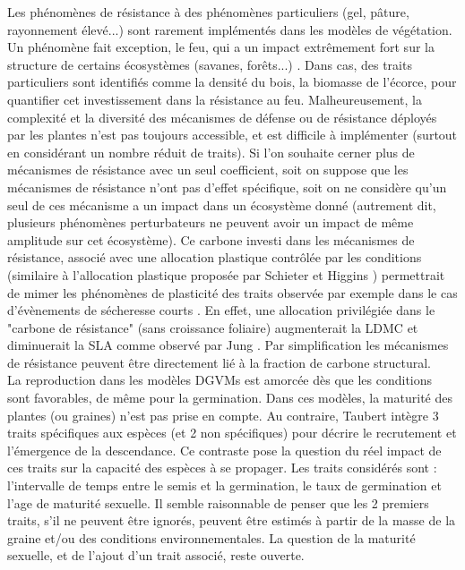 \documentclass[french]{article}
\begin{document}
{\indent Les phénomènes de résistance à des phénomènes particuliers (gel, pâture, rayonnement élevé...) sont rarement implémentés dans les modèles de végétation. Un phénomène fait exception, le feu, qui a un impact extrêmement fort sur la structure de certains écosystèmes (savanes, forêts...) \cite{Scheiter2013}. Dans cas, des traits particuliers sont identifiés comme la densité du bois, la biomasse de l'écorce, pour quantifier cet investissement dans la résistance au feu. Malheureusement, la complexité et la diversité des mécanismes de défense ou de résistance déployés par les plantes n'est pas toujours accessible, et est difficile à implémenter (surtout en considérant un nombre réduit de traits). Si l'on souhaite cerner plus de mécanismes de résistance avec un seul coefficient, soit on suppose que les mécanismes de résistance n'ont pas d'effet spécifique, soit on ne considère qu'un seul de ces mécanisme a un impact dans un écosystème donné (autrement dit, plusieurs phénomènes perturbateurs ne peuvent avoir un impact de même amplitude sur cet écosystème). Ce carbone investi dans les mécanismes de résistance, associé avec une allocation plastique contrôlée par les conditions (similaire à l'allocation plastique proposée par Schieter et Higgins \cite{Scheiter2009}) permettrait de mimer les phénomènes de plasticité des traits observée par exemple dans le cas d'évènements de sécheresse courts \cite{Jung2014}. En effet, une allocation privilégiée dans le "carbone de résistance" (sans croissance foliaire) augmenterait la LDMC et diminuerait la SLA comme observé par Jung \cite{Jung2014}. Par simplification les mécanismes de résistance peuvent être directement lié à la fraction de carbone structural. \\

\indent La reproduction dans les modèles DGVMs est amorcée dès que les conditions sont favorables, de même pour la germination. Dans ces modèles, la maturité des plantes (ou graines) n'est pas prise en compte. Au contraire, Taubert \cite{Taubert2014} intègre 3 traits spécifiques aux espèces (et 2 non spécifiques) pour décrire le recrutement et l'émergence de la descendance. Ce contraste pose la question du réel impact de ces traits sur la capacité des espèces à se propager. Les traits considérés sont : l'intervalle de temps entre le semis et la germination, le taux de germination et l'age de maturité sexuelle. Il semble raisonnable de penser que les 2 premiers traits, s'il ne peuvent être ignorés, peuvent être estimés à partir de la masse de la graine et/ou des conditions environnementales. La question de la maturité sexuelle, et de l'ajout d'un trait associé, reste ouverte.\\

}
\end{document}
